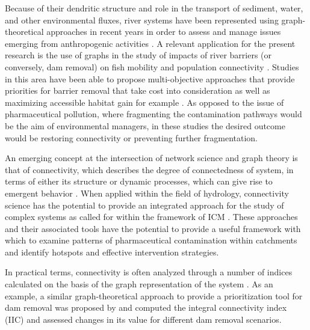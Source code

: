 \documentclass{article}
\begin{document}
Because of their dendritic structure and role in the transport of sediment, water, and other environmental fluxes, river systems have been represented using graph-theoretical approaches in recent years in order to assess and manage issues emerging from anthropogenic activities \citep{Abed-Elmdoust2016ReorganizationApproach,Abed-Elmdoust2017EmergentApproach,Cieplak1998ModelsBasins,Eros2011NetworkApproach,Tejedor2015DeltaSurfaces}. A relevant application for the present research is the use of graphs in the study of impacts of river barriers (or conversely, dam removal) on fish mobility and population connectivity \citep{Sarker2019CriticalNetworks,Schick2007DirectedNetwork,Segurado2013PrioritizingApproach}. Studies in this area have been able to propose multi-objective approaches that provide priorities for barrier removal that take cost into consideration as well as maximizing accessible habitat gain for example \citep{OHanley2005OptimizingBarriers}. As opposed to the issue of pharmaceutical pollution, where fragmenting the contamination pathways would be the aim of environmental managers, in these studies the desired outcome would be restoring connectivity or preventing further fragmentation.

An emerging concept at the intersection of network science and graph theory is that of connectivity, which describes the degree of connectedness of system, in terms of either its structure or dynamic processes, which can give rise to emergent behavior \citep{Turnbull2018ConnectivityPerspective}. When applied within the field of hydrology, connectivity science has the potential to provide an integrated approach for the study of complex systems as called for within the framework of ICM  \citep{Lexartza-Artza2009HydrologicalImplications}. These approaches and their associated tools have the potential to provide a useful framework with which to examine patterns of pharmaceutical contamination within catchments and identify hotspots and effective intervention strategies.

In practical terms, connectivity is often analyzed through a number of indices calculated on the basis of the graph representation of the system \citep{Ali2010ShoppingCatchment,Heckmann2018IndicesLimitations}.  As an example, a similar graph-theoretical approach to provide a prioritization tool for dam removal was proposed by \citet{Segurado2013PrioritizingApproach} and computed the integral connectivity index (IIC) and assessed changes in its value for different dam removal scenarios.
\end{document}
